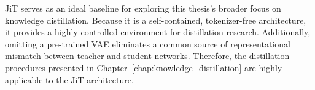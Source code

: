 JiT serves as an ideal baseline for exploring this thesis’s broader focus on knowledge distillation. Because it is a self-contained, tokenizer-free architecture, it provides a highly controlled environment for distillation research. Additionally, omitting a pre-trained VAE eliminates a common source of representational mismatch between teacher and student networks. Therefore, the distillation procedures presented in Chapter~\ref{chap:knowledge_distillation} are highly applicable to the JiT architecture.